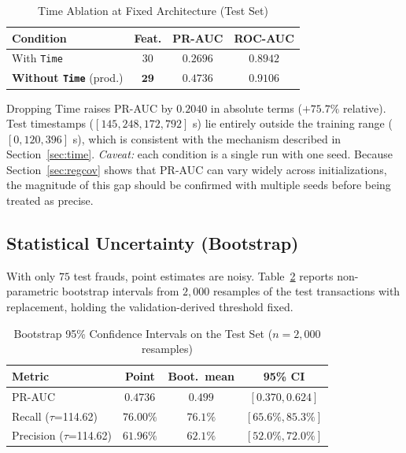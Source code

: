 \documentclass[conference]{IEEEtran}
\begin{document}
\begin{table}[!t]
\centering
\caption{Time Ablation at Fixed Architecture (Test Set)}
\renewcommand{\arraystretch}{1.15}
\footnotesize
\begin{tabular}{lccc}
\toprule
\textbf{Condition} & \textbf{Feat.} & \textbf{PR-AUC} & \textbf{ROC-AUC} \\
\midrule
With \texttt{Time} & $30$ & $0.2696$ & $0.8942$ \\
\textbf{Without \texttt{Time}} (prod.) & $\mathbf{29}$ & $\mathbf{0.4736}$ & $\mathbf{0.9106}$ \\
\bottomrule
\end{tabular}
\label{tab:ablation}
\end{table}

Dropping $\text{Time}$ raises PR-AUC by $0.2040$ in absolute terms ($+75.7\%$ relative). Test timestamps ($[145{,}248, 172{,}792]$ s) lie entirely outside the training range ($[0, 120{,}396]$ s), which is consistent with the mechanism described in Section~\ref{sec:time}. \emph{Caveat:} each condition is a single run with one seed. Because Section~\ref{sec:regcov} shows that PR-AUC can vary widely across initializations, the magnitude of this gap should be confirmed with multiple seeds before being treated as precise.

\subsection{Statistical Uncertainty (Bootstrap)}
With only $75$ test frauds, point estimates are noisy. Table~\ref{tab:bootstrap} reports non-parametric bootstrap intervals from $2{,}000$ resamples of the test transactions with replacement, holding the validation-derived threshold fixed.

\begin{table}[!t]
\centering
\caption{Bootstrap 95\% Confidence Intervals on the Test Set ($n=2{,}000$ resamples)}
\renewcommand{\arraystretch}{1.15}
\footnotesize
\setlength{\tabcolsep}{3pt}
\begin{tabular}{lccc}
\toprule
\textbf{Metric} & \textbf{Point} & \textbf{Boot.\ mean} & \textbf{95\% CI} \\
\midrule
PR-AUC & $0.4736$ & $0.499$ & $[0.370, 0.624]$ \\
Recall ($\tau$=114.62) & $76.00\%$ & $76.1\%$ & $[65.6\%, 85.3\%]$ \\
Precision ($\tau$=114.62) & $61.96\%$ & $62.1\%$ & $[52.0\%, 72.0\%]$ \\
\bottomrule
\end{tabular}
\label{tab:bootstrap}
\end{table}
\end{document}
